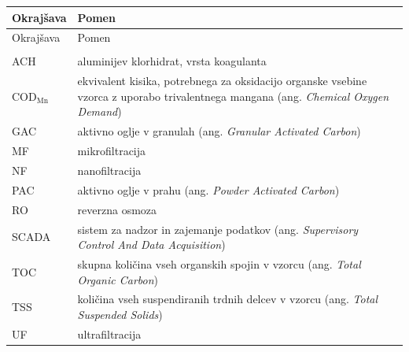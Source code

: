 
\begin{longtable}[l]{@{}p{}@{}p{}@{}}
\hline
Okrajšava & Pomen\\
\hline
\endfirsthead
\hline
Okrajšava & Pomen\\
\hline
\endhead
&\\
ACH & aluminijev klorhidrat, vrsta koagulanta\\
COD$_{\text{Mn}}$ & ekvivalent kisika, potrebnega za oksidacijo organske vsebine vzorca z uporabo trivalentnega mangana (ang. \emph{Chemical Oxygen Demand})\\
GAC & aktivno oglje v granulah (ang. \emph{Granular Activated Carbon})\\
MF & mikrofiltracija\\
NF & nanofiltracija\\
PAC & aktivno oglje v prahu (ang. \emph{Powder Activated Carbon})\\
RO & reverzna osmoza\\
SCADA & sistem za nadzor in zajemanje podatkov (ang. \emph{Supervisory Control And Data Acquisition})\\
TOC & skupna količina vseh organskih spojin v vzorcu (ang. \emph{Total Organic Carbon})\\
TSS & količina vseh suspendiranih trdnih delcev v vzorcu (ang. \emph{Total Suspended Solids})\\
UF & ultrafiltracija\\
\end{longtable}

\newpage

